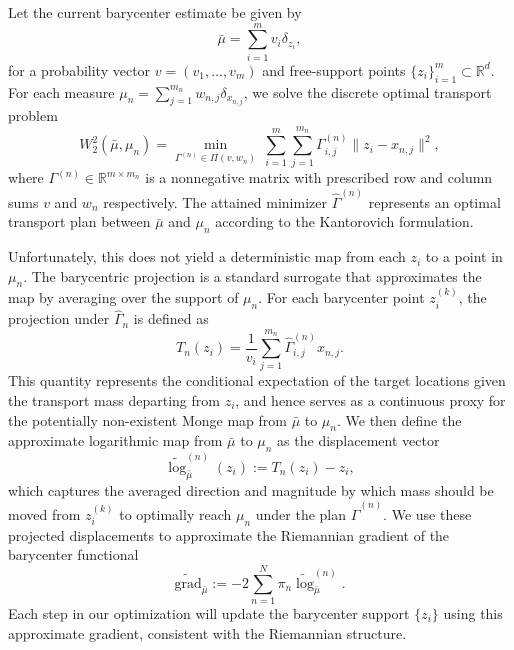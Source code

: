 \documentclass[11pt]{article}
\newcommand{\bbR}{\mathbb{R}}
\begin{document}
Let the current barycenter estimate be given by
\begin{equation*}
    \bar{\mu} = \sum_{i=1}^m v_i \delta_{z_i},
\end{equation*}
for a probability vector $v = (v_1,\ldots,  v_m)$ and free-support points $\lbrace z_i\rbrace_{i=1}^m \subset \bbR^d$. For each measure $\mu_n = \sum_{j=1}^{m_n} w_{n,j} \delta_{x_{n,j}}$, we solve the discrete optimal transport problem 
\begin{equation*}
    W_2^2 (\bar{\mu}, \mu_n) = \underset{\Gamma^{(n)}\in \Pi(v, w_n)}{\min}~ \sum_{i=1}^m \sum_{j=1}^{m_n} \Gamma^{(n)}_{i,j}  \|z_i - x_{n,j}\|^2,
\end{equation*}
where $\Gamma^{(n)} \in \bbR^{m\times m_n}$ is a nonnegative matrix with prescribed row and column sums $v$ and $w_n$ respectively. The attained minimizer $\hat{\Gamma}^{(n)}$ represents an optimal transport plan between $\bar{\mu}$ and $\mu_n$ according to the Kantorovich formulation.

Unfortunately, this does not  yield a deterministic map from each $z_i$ to a point in $\mu_n$. The barycentric projection is a standard surrogate that approximates the map by averaging over the support of $\mu_n$. For each barycenter point $z_i^{(k)}$, the projection under $\hat{\Gamma}_n$ is defined as 
\begin{equation*}
    T_n(z_i) = \frac{1}{v_i} \sum_{j=1}^{m_n} \hat{\Gamma}^{(n)}_{i,j} x_{n,j}.
\end{equation*}
This quantity represents the conditional expectation of the target locations given the transport mass departing from $z_i$, and hence serves as a continuous proxy for the potentially non-existent Monge map from $\bar{\mu}$ to $\mu_n$.  We then define the approximate logarithmic map from $\bar{\mu}$ to $\mu_n$ as the displacement vector
\begin{equation*}
    \widetilde{\log}_{\bar{\mu}}^{(n)}(z_i) := T_n(z_i) - z_i,
\end{equation*}
which captures the averaged direction and magnitude by which mass should be moved from $z_i^{(k)}$ to optimally reach $\mu_n$ under the plan $\hat{\Gamma}^{(n)}$. We use these projected displacements to approximate the Riemannian gradient of the barycenter functional
\begin{equation*}
    \widetilde{\text{grad}}_{\bar{\mu}} := -2 \sum_{n=1}^N \pi_n \widetilde{\log}_{\bar{\mu}}^{(n)}.
\end{equation*}
Each step in our optimization will update the barycenter support $\lbrace z_i\rbrace$ using this approximate gradient, consistent with the Riemannian structure.
\end{document}
